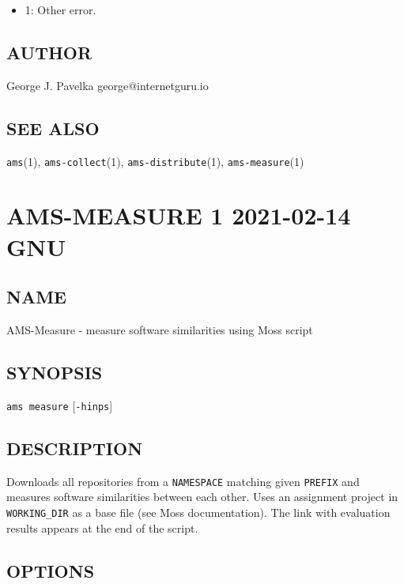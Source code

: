 \begin{itemize}
\item
  1: Other error.
\end{itemize}

\subsection{AUTHOR}\label{author-3}

George J. Pavelka george@internetguru.io

\subsection{SEE ALSO}\label{see-also-3}

\texttt{ams}(1), \texttt{ams-collect}(1), \texttt{ams-distribute}(1), \texttt{ams-measure}(1)

\section{AMS-MEASURE 1 2021-02-14 GNU}\label{ams-measure-1-2021-02-14-gnu-user-manuals}

\subsection{NAME}\label{name-4}

AMS-Measure - measure software similarities using Moss script

\subsection{SYNOPSIS}\label{synopsis-4}

\texttt{ams\ measure} {[}\texttt{-hinps}{]}

\subsection{DESCRIPTION}\label{description-4}

Downloads all repositories from a \texttt{NAMESPACE} matching given \texttt{PREFIX} and measures software similarities between each other. Uses an assignment project in \texttt{WORKING\_DIR} as a base file (see Moss documentation). The link with evaluation results appears at the end of the script.

\subsection{OPTIONS}\label{options-4}

